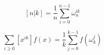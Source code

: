 $$ [n|k] = \frac{1}{n}\sum_{i=0}^{n-1}\omega_n^{ik} $$

$$ \sum_{i \ge 0} [x^{ik}]f(x) = \frac{1}{k}\sum_{j=0}^{k-1}f(\omega_{k}^j) $$